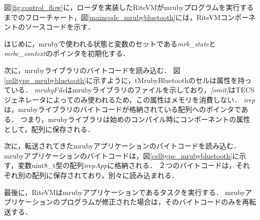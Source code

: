 \documentclass[submit,techrep]{ipsj}
\begin{document}
図\ref{fig:control_flow}に，ローダを実装したRiteVMがmrubyプログラムを実行するまでのフローチャート，図\ref{maincode_mrubybluetooth}には，RiteVMコンポーネントのソースコードを示す．

はじめに，mrubyで使われる状態と変数のセットである{\it mrb\_state}と{\it mrbc\_context}のポインタを初期化する．

次に，mrubyライブラリのバイトコードを読み込む．
図\ref{celltype_mrubybluetooth}に示すように，tMrubyBluetoothのセルは属性を持っている．
{\it mrubyFile}はmrubyライブラリのファイルを示しており，{\it [omit]}はTECSジェネレータによってのみ使われるため，この属性はメモリを消費しない．
{\it irep}は，mrubyライブラリのバイトコードが格納されている配列へのポインタである．
つまり，mrubyライブラリは始めのコンパイル時にコンポーネントの属性として，配列に保存される．

次に，転送されてきたmrubyアプリケーションのバイトコードを読み込む．
mrubyアプリケーションのバイトコードは，図\ref{celltype_mrubybluetooth}に示す，変数uint8\_t型の配列{\it irepApp}に格納される．
２つのバイトコードは，それぞれ別の配列に保存されており，別々に読み込まれる．

最後に，RiteVMはmrubyアプリケーションであるタスクを実行する．
mrubyアプリケーションのプログラムが修正された場合は，そのバイトコードのみを再転送する．
\end{document}
